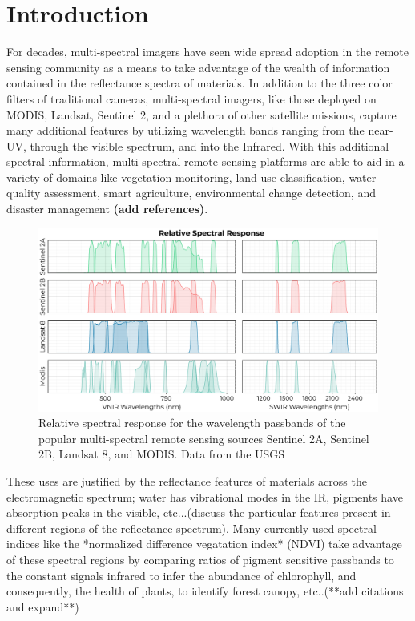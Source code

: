 \documentclass[remotesensing,article,submit,pdftex,moreauthors]{Definitions/mdpi}
\begin{document}

\section{Introduction}


For decades, multi-spectral imagers have seen wide spread adoption in the remote sensing community as a means to take advantage of the wealth of information contained in the reflectance spectra of materials. In addition to the three color filters of traditional cameras, multi-spectral imagers, like those deployed on MODIS, Landsat, Sentinel 2, and a plethora of other satellite missions, capture many additional features by utilizing wavelength bands ranging from the near-UV, through the visible spectrum, and into the Infrared. With this additional spectral information, multi-spectral remote sensing platforms are able to aid in a variety of domains like vegetation monitoring, land use classification, water quality assessment, smart agriculture, environmental change detection, and disaster management \textbf{(add references)}. 

\begin{figure}[H]
    \centering
    \includegraphics[width=15cm]{./assets/passbands.eps}
    \caption{Relative spectral response for the wavelength passbands of the popular multi-spectral remote sensing sources Sentinel 2A, Sentinel 2B, Landsat 8, and MODIS. Data from the USGS}
    \label{fig:passbands}
\end{figure}


These uses are justified by the reflectance features of materials across the electromagnetic spectrum; water has vibrational modes in the IR, pigments have absorption peaks in the visible, etc...(discuss the particular features present in different regions of the reflectance spectrum). Many currently used spectral indices like the *normalized difference vegatation index* (NDVI) take advantage of these spectral regions by comparing ratios of pigment sensitive passbands to the constant signals infrared to infer the abundance of chlorophyll, and consequently, the health of plants, to identify forest canopy, etc..(**add citations and expand**)
\end{document}
